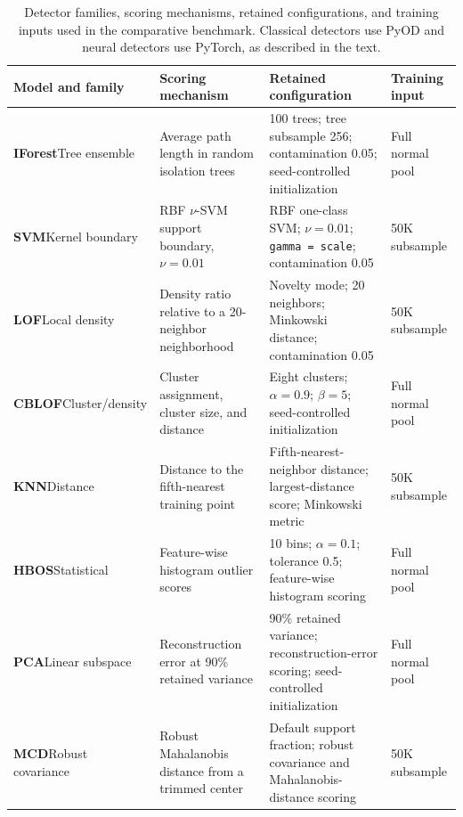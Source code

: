 \documentclass[10pt,conference]{IEEEtran}
\begin{document}
\begin{table}[t]
\caption{Detector families, scoring mechanisms, retained configurations, and training inputs used in the comparative benchmark. Classical detectors use PyOD and neural detectors use PyTorch, as described in the text.}
\label{tab:detector_summary}
\centering
\scriptsize
\setlength{\tabcolsep}{2.5pt}
\renewcommand{\arraystretch}{1.08}
\begin{tabular}{|p{2.1cm}|p{3.25cm}|p{7.6cm}|p{2.0cm}|}
\hline
\textbf{Model and family} & \textbf{Scoring mechanism} & \textbf{Retained configuration} & \textbf{Training input} \\
\hline
\textbf{IForest}\newline Tree ensemble & Average path length in random isolation trees & 100 trees; tree subsample 256; contamination 0.05; seed-controlled initialization & Full normal pool \\
\textbf{SVM}\newline Kernel boundary & RBF $\nu$-SVM support boundary, $\nu=0.01$ & RBF one-class SVM; $\nu=0.01$; \texttt{gamma = scale}; contamination 0.05 & 50K subsample \\
\textbf{LOF}\newline Local density & Density ratio relative to a 20-neighbor neighborhood & Novelty mode; 20 neighbors; Minkowski distance; contamination 0.05 & 50K subsample \\
\textbf{CBLOF}\newline Cluster/density & Cluster assignment, cluster size, and distance & Eight clusters; $\alpha=0.9$; $\beta=5$; seed-controlled initialization & Full normal pool \\
\textbf{KNN}\newline Distance & Distance to the fifth-nearest training point & Fifth-nearest-neighbor distance; largest-distance score; Minkowski metric & 50K subsample \\
\textbf{HBOS}\newline Statistical & Feature-wise histogram outlier scores & 10 bins; $\alpha=0.1$; tolerance 0.5; feature-wise histogram scoring & Full normal pool \\
\textbf{PCA}\newline Linear subspace & Reconstruction error at 90\% retained variance & 90\% retained variance; reconstruction-error scoring; seed-controlled initialization & Full normal pool \\
\textbf{MCD}\newline Robust covariance & Robust Mahalanobis distance from a trimmed center & Default support fraction; robust covariance and Mahalanobis-distance scoring & 50K subsample \\

\end{tabular}
\end{table}
\end{document}
